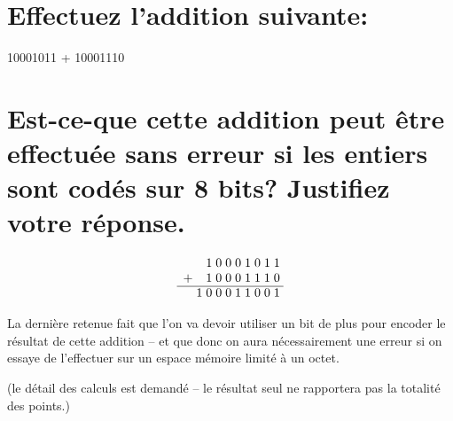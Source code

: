 \documentclass[11pt,a4paper]{exam}
\begin{document}
\begin{questions}
\begin{spacing}{1}
	            \begin{parts}
	            	\part[1] {Effectuez l'addition suivante:} 10001011 + 10001110
	            	\part[1] {Est-ce-que cette addition peut être effectuée sans erreur si les entiers sont codés sur 8 bits? Justifiez votre réponse.}
	           	\end{parts}
	           	\begin{solution}
	           		\[
	           		\begin{array}{r *{10}{@{\;}c}}
	           			&& 1 & 0 & 0 & 0 & 1 & 0 & 1 & 1 \\
	           			+ & & 1 & 0 & 0 & 0 & 1 & 1 & 1 & 0 \\
	           			\cline{1-10}
	           			&1 & 0 & 0 & 0 & 1 & 1 & 0 & 0 & 1 \\
	           		\end{array}
	           		\]
	           		
	           		La dernière retenue fait que l'on va devoir utiliser un bit de plus pour encoder le résultat de cette addition -- et que donc on aura nécessairement une erreur si on essaye de l'effectuer sur un espace mémoire limité à un octet.
	           	\end{solution}
            	
		 (le détail des calculs est demandé -- le résultat seul ne rapportera pas la totalité des points.)
\end{spacing}
\end{questions}
\end{document}
